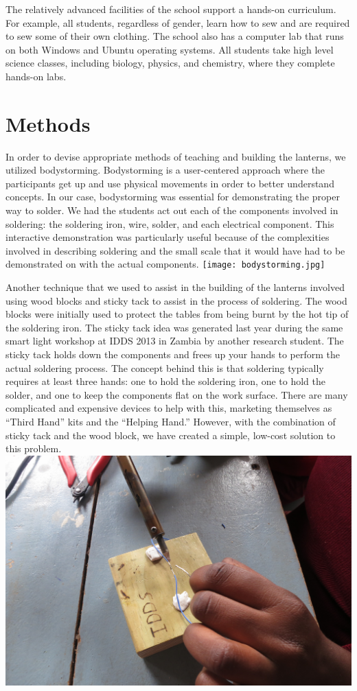 \documentclass[11pt, twocolumn]{article}
\begin{document}
The relatively advanced facilities of the school support a hands-on curriculum. For example, all students, regardless of gender, learn how to sew and are required to sew some of their own clothing. The school also has a computer lab that runs on both Windows and Ubuntu operating systems. All students take high level science classes, including biology, physics, and chemistry, where they complete hands-on labs.

\section*{Methods}
In order to devise appropriate methods of teaching and building the lanterns, we utilized bodystorming. Bodystorming is a user-centered approach where the participants get up and use physical movements in order to better understand concepts. In our case, bodystorming was essential for demonstrating the proper way to solder. We had the students act out each of the components involved in soldering: the soldering iron, wire, solder, and each electrical component. This interactive demonstration was particularly useful because of the complexities involved in describing soldering and the small scale that it would have had to be demonstrated on with the actual components.
\texttt{[image: bodystorming.jpg]}

Another technique that we used to assist in the building of the lanterns involved using wood blocks and sticky tack to assist in the process of soldering. The wood blocks were initially used to protect the tables from being burnt by the hot tip of the soldering iron. The sticky tack idea was generated last year during the same smart light workshop at IDDS 2013 in Zambia by another research student. The sticky tack holds down the components and frees up your hands to perform the actual soldering process. The concept behind this is that soldering typically requires at least three hands: one to hold the soldering iron, one to hold the solder, and one to keep the components flat on the work surface. There are many complicated and expensive devices to help with this, marketing themselves as “Third Hand” kits and the “Helping Hand.” However, with the combination of sticky tack and the wood block, we have created a simple, low-cost solution to this problem.
\includegraphics[width=\columnwidth]{wood_block_soldering.jpg}
\end{document}
